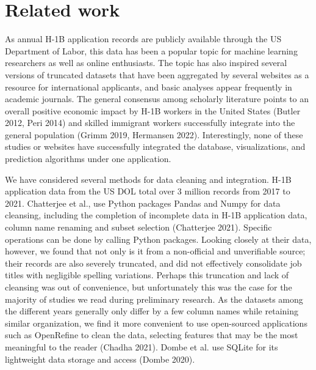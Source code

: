 \documentclass[sigconf]{acmart}
\begin{document}
\section{Related work}


As annual H-1B application records are publicly available through the US Department of Labor, 
this data has been a popular topic for machine learning researchers as well as online enthusiasts.  
The topic has also inspired several versions of truncated datasets that have been aggregated by several websites as a resource 
for international applicants, and basic analyses appear frequently in academic journals. The general consensus among 
scholarly literature points to an overall positive economic impact by H-1B workers in the United States (Butler 2012, Peri 2014) and 
skilled immigrant workers successfully integrate into the general population (Grimm 2019, Hermansen 2022). 
Interestingly, none of these studies or websites have successfully integrated the database, 
visualizations, and prediction algorithms under one application. 



We have considered several methods for data cleaning and integration. H-1B application data from the US DOL total over 3 million 
records from 2017 to 2021. Chatterjee et al., use Python packages Pandas and Numpy for data cleansing, including the 
completion of incomplete data in H-1B application data, column name renaming and subset selection (Chatterjee 2021). Specific operations can be done 
by calling Python packages. Looking closely at their data, however, we found that not only is it from a non-official and unverifiable 
source; their records are also severely truncated, and did not effectively consolidate job titles with negligible spelling variations. 
Perhaps this truncation and lack of cleansing was out of convenience, but unfortunately this was the case for the majority of studies 
we read during preliminary research. As the datasets among the different years generally only differ by a few column names while 
retaining similar organization, we find it more convenient to use open-sourced applications such as OpenRefine to clean the data, selecting features 
that may be the most meaningful to the reader (Chadha 2021).  
Dombe et al. use SQLite for its lightweight data storage and access (Dombe 2020).  
\end{document}
